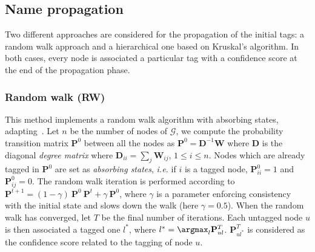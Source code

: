 \subsection{Name propagation}

Two different approaches are considered for the propagation of the initial tags: a random walk approach and a hierarchical one based on Kruskal's algorithm. In both cases, every node is associated a particular tag with a confidence score at the end of the propagation phase.

\subsubsection{Random walk (RW)}

This method implements a random walk algorithm with absorbing states, adapting~\cite{zhu2002}. Let $n$ be the number of nodes of $\mathcal{G}$, we compute the probability transition matrix $\mathbf{P}^0$ between all the nodes as $\mathbf{P}^0 = \mathbf{D}^{-1}\mathbf{W}$ where $\mathbf{D}$ is the diagonal {\it degree matrix} where $\mathbf{D}_{ii} = \sum_j \mathbf{W}_{ij}$, $1\leq i \leq n$. Nodes which are already tagged in $\mathbf{P}^0$ are set as \textit{absorbing states}, \textit{i.e.} if $i$ is a tagged node, $\mathbf{P}^0_{ii} = 1$ and $\mathbf{P}^0_{ij} = 0$. The random walk iteration is performed according to $\mathbf{P}^{t+1} = (1-\gamma) ~\mathbf{P}^0 ~ \mathbf{P}^{t} + \gamma ~\mathbf{P}^0$, where $\gamma$ is a parameter enforcing consistency with the initial state and slows down the walk (here $\gamma = 0.5$). When the random walk has converged, let $T$ be the final number of iterations. Each untagged node $u$ is then associated a tagged one $l^*$, where $l^*=\argmax_l{\mathbf{P}^{T}_{ul}}$. $\mathbf{P}^{T}_{ul^*}$ is considered as the confidence score related to the tagging of node $u$.

